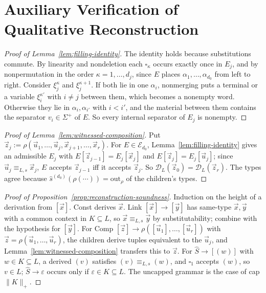 \documentclass[11pt]{article}
\numberwithin{equation}{section}
\theoremstyle{plain}
\theoremstyle{definition}
\theoremstyle{remark}
\newcommand{\D}{\mathcal{D}}
\newcommand{\out}{\mathrm{out}}
\newcommand{\tuple}[1]{\vec{#1}}
\newcommand{\blank}{\square}
\newcommand{\eps}{\varepsilon}
\theoremstyle{plain}
\begin{document}
\section{Auxiliary Verification of Qualitative Reconstruction}
\label{app:qualitative-construction-details}

\begin{proof}[Proof of Lemma~\ref{lem:filling-identity}]
The identity holds because substitutions commute.  By linearity and
nondeletion each $\blank_\kappa$ occurs exactly once in $E_j$, and by
nonpermutation in the order $\kappa=1,\ldots,d_j$, since $E$ places
$\alpha_1,\ldots,\alpha_{d_0}$ from left to right.  Consider $\xi_j^\kappa$ and
$\xi_j^{\kappa+1}$.  If both lie in one $\alpha_i$, nonmerging puts a terminal
or a variable $\xi_i^{\kappa'}$ with $i\ne j$ between them, which becomes a
nonempty word.  Otherwise they lie in $\alpha_i,\alpha_{i'}$ with $i<i'$, and
the material between them contains the separator $v_i\in\Sigma^+$ of $E$.  So
every internal separator of $E_j$ is nonempty.
\end{proof}

\begin{proof}[Proof of Lemma~\ref{lem:witnessed-composition}]
Put $\tuple z_j:=\rho(\tuple u_1,\ldots,\tuple u_j,\tuple x_{j+1},\ldots,\tuple x_r)$.
For $E\in\mathcal E_{d_0}$, Lemma~\ref{lem:filling-identity} gives an admissible $E_j$ with
$E[\tuple z_{j-1}]=E_j[\tuple x_j]$ and $E[\tuple z_j]=E_j[\tuple u_j]$; since
$\tuple u_j\equiv_{L,s}\tuple x_j$, $E$ accepts $\tuple z_{j-1}$ iff it accepts
$\tuple z_j$.  So $\D_L(\tuple z_0)=\D_L(\tuple z_r)$.  The types agree because
$\widehat s^{(d_0)}(\rho(\cdots))=\out_\rho$ of the children's types.
\end{proof}

\begin{proof}[Proof of Proposition~\ref{prop:reconstruction-soundness}]
Induction on the height of a derivation from $[\tuple x]$.  Const derives $\tuple x$.
Link $[\tuple x]\to[\tuple y]$ has same-type $\tuple x,\tuple y$ with a common context
in $K\subseteq L$, so $\tuple x\equiv_{L,s}\tuple y$ by substitutability; combine with
the hypothesis for $[\tuple y]$.  For Comp
$[\tuple z]\to\rho([\tuple u_1],\ldots,[\tuple u_r])$ with $\tuple z=\rho(\tuple u_1,
\ldots,\tuple u_r)$, the children derive tuples equivalent to the $\tuple u_j$, and
Lemma~\ref{lem:witnessed-composition} transfers this to $\tuple z$.  For
$\widehat S\to[(w)]$ with $w\in K\subseteq L$, a derived $(v)$ satisfies
$(v)\equiv_{L,s}(w)$, and $\blank_1$ accepts $(w)$, so $v\in L$; $\widehat S\to\eps$ occurs
only if $\eps\in K\subseteq L$.  The uncapped grammar is the case of cap $\|K\|_+$.
\end{proof}
\end{document}

